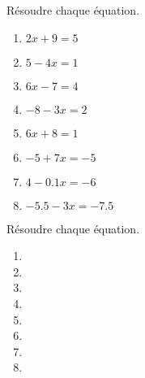 \begin{exercice*}
    Résoudre chaque équation.
    \begin{multicols}{2}
        \begin{enumerate}
            \item $2x+9=5$
            \item $5-4x=1$
            \item $6x-7=4$
            \item $-8-3x=2$
            \item $6x+8=1$
            \item $-5+7x=-5$
            \item $4-\num{0.1}x=-6$
            \item $\num{-5.5}-3x=\num{-7.5}$
        \end{enumerate}
    \end{multicols}
\end{exercice*}
\begin{corrige}
    Résoudre chaque équation.
    \begin{multicols}{2}
        \begin{enumerate}
            \item {}
            \item {}
            \item {}
            \item {}
            \item {}
            \item {}
            \item {}
            \item {}
        \end{enumerate}
    \end{multicols}    
\end{corrige}

